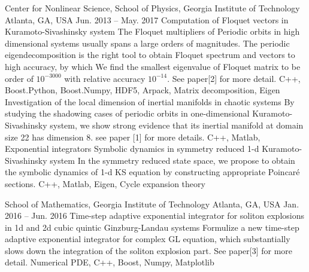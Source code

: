 


\begin{cventries}
  \cvresearch
  {Center for Nonlinear Science, School of Physics, Georgia Institute of Technology}
  {Atlanta, GA, USA}
  {Jun. 2013 -- May. 2017}
  {
    \cvresearchitem
    {Computation of Floquet vectors in Kuramoto-Sivashinsky system}
    {The Floquet multipliers of Periodic orbits in high dimensional systems usually spans a large orders 
     of magnitudes. The periodic eigendecomposition is the right tool to obtain Floquet spectrum and
     vectors to high accuracy, by which We find the smallest eigenvalue of Floquet matrix to be order of 
     $10^{-3000}$ with relative accuracy $10^{-14}$. See paper[2] for more detail.}
    {C++, Boost.Python, Boost.Numpy, HDF5, Arpack, Matrix decomposition, Eigen}
    \cvresearchitem
    {Investigation of the local dimension of inertial manifolds in chaotic systems}
    {By studying the shadowing cases of periodic orbits in one-dimensional Kuramoto-Sivashinsky system, 
     we show strong evidence that its inertial manifold at domain size 22 has dimension 8. see paper [1] for more details. }
    {C++, Matlab, Exponential integrators}
    \cvresearchitem
    {Symbolic dynamics in symmetry reduced 1-d Kuramoto-Sivashinsky system}
    {In the symmetry reduced state space, we propose to obtain the symbolic dynamics of 1-d KS equation by constructing appropriate Poincar\'e sections.}
    {C++, Matlab, Eigen, Cycle expansion theory}
  }

  \cvresearch
  {School of Mathematics, Georgia Institute of Technology} 
  {Atlanta, GA, USA}
  {Jan. 2016 -- Jun. 2016} 
  {
    \cvresearchitem
    {Time-step adaptive exponential integrator for soliton explosions in 1d and 2d cubic quintic Ginzburg-Landau systems}
    {Formulize a new time-step adaptive exponential integrator for complex GL equation, which
     substantially slows down the integration of the soliton explosion part. See paper[3] for more
     detail.}
    {Numerical PDE, C++, Boost, Numpy, Matplotlib}
  }


\end{cventries}
